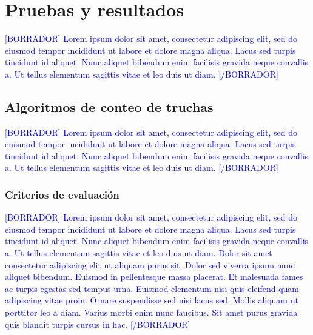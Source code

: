 
\pagestyle{myportland}
\doublespacing
\chapter[----- Pruebas y resultados]{Pruebas y resultados}
\thispagestyle{myportland}

\textcolor{blue}{[BORRADOR] Lorem ipsum dolor sit amet, consectetur adipiscing elit, sed do eiusmod tempor incididunt ut labore et dolore magna aliqua. Lacus sed turpis tincidunt id aliquet. Nunc aliquet bibendum enim facilisis gravida neque convallis a. Ut tellus elementum sagittis vitae et leo duis ut diam. [/BORRADOR]} 

\section{Algoritmos de conteo de truchas}

\textcolor{blue}{[BORRADOR] Lorem ipsum dolor sit amet, consectetur adipiscing elit, sed do eiusmod tempor incididunt ut labore et dolore magna aliqua. Lacus sed turpis tincidunt id aliquet. Nunc aliquet bibendum enim facilisis gravida neque convallis a. Ut tellus elementum sagittis vitae et leo duis ut diam. [/BORRADOR]} 

\subsection{Criterios de evaluación}

\textcolor{blue}{[BORRADOR] Lorem ipsum dolor sit amet, consectetur adipiscing elit, sed do eiusmod tempor incididunt ut labore et dolore magna aliqua. Lacus sed turpis tincidunt id aliquet. Nunc aliquet bibendum enim facilisis gravida neque convallis a. Ut tellus elementum sagittis vitae et leo duis ut diam. Dolor sit amet consectetur adipiscing elit ut aliquam purus sit. Dolor sed viverra ipsum nunc aliquet bibendum. Euismod in pellentesque massa placerat. Et malesuada fames ac turpis egestas sed tempus urna. Euismod elementum nisi quis eleifend quam adipiscing vitae proin. Ornare suspendisse sed nisi lacus sed. Mollis aliquam ut porttitor leo a diam. Varius morbi enim nunc faucibus. Sit amet purus gravida quis blandit turpis cursus in hac. [/BORRADOR]} 

